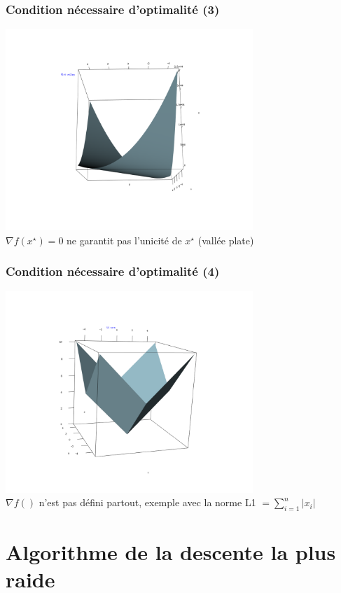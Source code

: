 \documentclass[12pt]{beamer}
\begin{document}
\begin{frame}
\frametitle{Condition nécessaire d’optimalité (3)} 
\begin{center}
\includegraphics[width=0.7\textwidth]{flat_valley.png} \\
$\nabla f(x^\star) = 0$ ne garantit pas l’unicité de $x^\star$ (vallée plate)
\end{center}
\end{frame}

\begin{frame}
\frametitle{Condition nécessaire d’optimalité (4)} 
\begin{center}
\includegraphics[width=0.7\textwidth]{L1norm.png} \\
$\nabla f()$ n’est pas défini partout, exemple avec la norme L1 $= \sum_{i=1}^n |x_i|$
\end{center}
\end{frame}


\section{Algorithme de la descente la plus raide}
\end{document}
